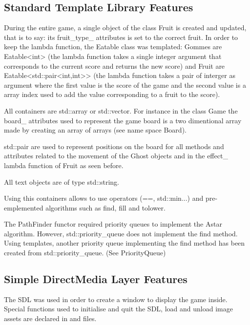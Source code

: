 \subsection{Standard Template Library Features}
During the entire game, a single object of the class \textsf{Fruit} is created and updated, that is to say: its \textsf{fruit\_type\_} attributes is set to the correct fruit. In order to keep the lambda function, the \textsf{Eatable} class was templated: \textsf{Gommes} are \textsf{Eatable\textless int\textgreater} (the lambda function takes a single integer argument that corresponds to the current score and returns the new score) and \textsf{Fruit} are \textsf{Eatable\textless std::pair\textless int,int\textgreater\textgreater} (the lambda function takes a pair of interger as argument where the first value is the score of the game and the second value is a array index used to add the value corresponding to a fruit to the score).

All containers are \textsf{std::array} or \textsf{std::vector}. For instance in the class \textsf{Game} the \textsf{board\_} attributes used to represent the game board is a two dimentional array made by creating an array of arrays (see name space \textsf{Board}).

\textsf{std::pair} are used to represent positions on the board for all methods and attributes related to the movement of the \textsf{Ghost} objects and in the \textsf{effect\_} lambda function of \textsf{Fruit} as seen before.

All text objects are of type \textsf{std::string}.

Using this containers allows to use operators (\textsf{==}, \textsf{std::min}...) and pre-emplemented algorithms such as \textsf{find}, \textsf{fill} and \textsf{tolower}.

The \textsf{PathFinder} functor required priority queues to implement the Astar algorithm.\cite{astar} However, \textsf{std::priority\_queue} does not implement the \textsf{find} method. Using templates, another priority queue implementing the \textsf{find} method has been created from \textsf{std::priority\_queue}. (See  \textsf{PriorityQueue})

\subsection{Simple DirectMedia Layer Features}
The SDL was used in order to create a window to display the game inside. Special functions used to initialise and quit the SDL, load and unload image assets are declared in  and  files.

